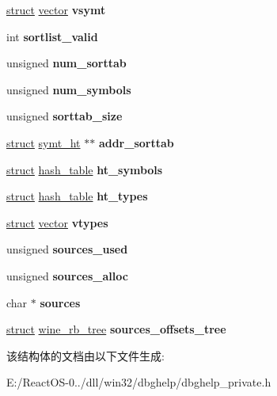 \begin{DoxyCompactItemize}
\item 
\mbox{\label{structmodule_aaa18d9bfeceb0b9aefae2db24be22818}} 
\hyperlink{interfacestruct}{struct} \hyperlink{structvector}{vector} {\bfseries vsymt}
\item 
\mbox{\label{structmodule_a4e17cbdfb412b4dd53a4387b776eadda}} 
int {\bfseries sortlist\+\_\+valid}
\item 
\mbox{\label{structmodule_a0b31fbd6feab8886b72b6d3be478c56b}} 
unsigned {\bfseries num\+\_\+sorttab}
\item 
\mbox{\label{structmodule_a34a1d67e7c35c3061c345b271ed7c980}} 
unsigned {\bfseries num\+\_\+symbols}
\item 
\mbox{\label{structmodule_a640c00ecc54ec821481f6e6afe3cfea9}} 
unsigned {\bfseries sorttab\+\_\+size}
\item 
\mbox{\label{structmodule_a4063661d705f485642e1d6205146b363}} 
\hyperlink{interfacestruct}{struct} \hyperlink{structsymt__ht}{symt\+\_\+ht} $\ast$$\ast$ {\bfseries addr\+\_\+sorttab}
\item 
\mbox{\label{structmodule_aace114b56a78c1651d91becb6dcec229}} 
\hyperlink{interfacestruct}{struct} \hyperlink{structhash__table}{hash\+\_\+table} {\bfseries ht\+\_\+symbols}
\item 
\mbox{\label{structmodule_a63475650fa111828fe92c30ec0fcbfaf}} 
\hyperlink{interfacestruct}{struct} \hyperlink{structhash__table}{hash\+\_\+table} {\bfseries ht\+\_\+types}
\item 
\mbox{\label{structmodule_affc98d7613822062397dacefc91844fb}} 
\hyperlink{interfacestruct}{struct} \hyperlink{structvector}{vector} {\bfseries vtypes}
\item 
\mbox{\label{structmodule_a696dd1585586855e3ddebacd0c8df2b0}} 
unsigned {\bfseries sources\+\_\+used}
\item 
\mbox{\label{structmodule_a85a23827227fbb5c3dd04ee0ec473d94}} 
unsigned {\bfseries sources\+\_\+alloc}
\item 
\mbox{\label{structmodule_a6f772c7fa308635b637a1d5755ee0218}} 
char $\ast$ {\bfseries sources}
\item 
\mbox{\label{structmodule_a41a4012d9640d7320c94ae11db46d052}} 
\hyperlink{interfacestruct}{struct} \hyperlink{structwine__rb__tree}{wine\+\_\+rb\+\_\+tree} {\bfseries sources\+\_\+offsets\+\_\+tree}
\end{DoxyCompactItemize}


该结构体的文档由以下文件生成\+:\begin{DoxyCompactItemize}
\item 
E\+:/\+React\+O\+S-\/0../dll/win32/dbghelp/dbghelp\+\_\+private.\+h\end{DoxyCompactItemize}
